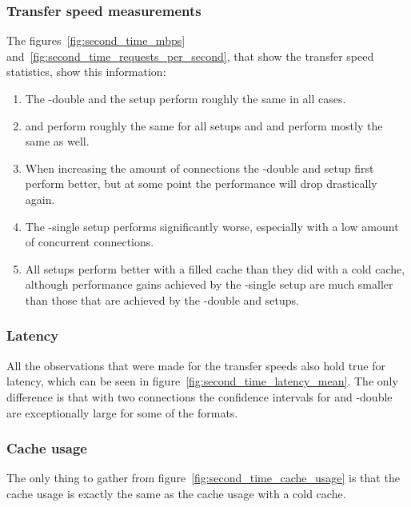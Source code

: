 \documentclass[twoside,openright]{uva-bachelor-thesis}
\begin{document}
\subsubsection{Transfer speed measurements}
The figures~\ref{fig:second_time_mbps}
and~\ref{fig:second_time_requests_per_second}, that show the transfer speed
statistics, show this information:
\begin{enumerate}
    \item
        The \lt-double and the \cdn setup perform roughly the same in all cases.

    \item
        \dash and \iss perform roughly the same for all setups and \hds and \hls
        perform mostly the same as well.

    \item
        When increasing the amount of connections the \lt-double and \cdn setup
        first perform better, but at some point the performance will drop
        drastically again.

    \item
        The \lt-single setup performs significantly worse, especially with a low
        amount of concurrent connections.

    \item
        All setups perform better with a filled cache than they did with a cold
        cache, although performance gains achieved by the \lt-single setup are
        much smaller than those that are achieved by the \lt-double and \cdn
        setups.

\end{enumerate}


\FloatBarrier

\subsubsection{Latency}
All the observations that were made for the transfer speeds also hold true for
latency, which can be seen in figure~\ref{fig:second_time_latency_mean}. The
only difference is that with two connections the confidence intervals for \cdn
and \lt-double are exceptionally large for some of the formats.

\FloatBarrier

\subsubsection{Cache usage}
The only thing to gather from figure~\ref{fig:second_time_cache_usage} is that
the cache usage is exactly the same as the cache usage with a cold cache.

\end{document}
